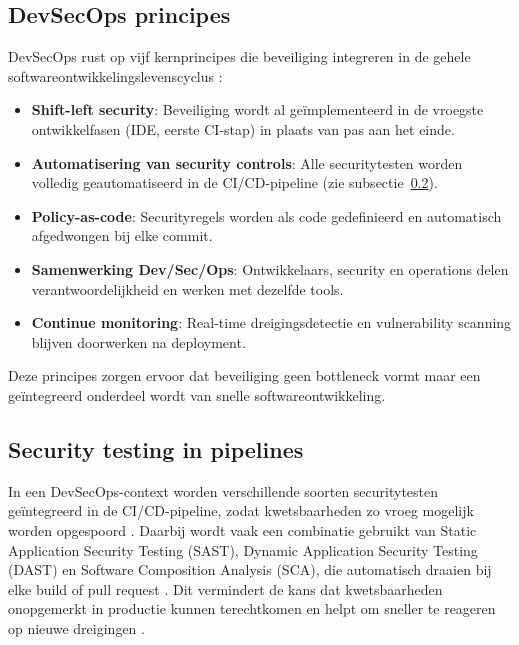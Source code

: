 \subsection{DevSecOps principes}
DevSecOps rust op vijf kernprincipes die beveiliging integreren in de gehele softwareontwikkelingslevenscyclus \autocite{RamdassJain2025}:

\begin{itemize}
\item \textbf{Shift-left security}: Beveiliging wordt al geïmplementeerd in de vroegste ontwikkelfasen (IDE, eerste CI-stap) in plaats van pas aan het einde.
\item \textbf{Automatisering van security controls}: Alle securitytesten worden volledig geautomatiseerd in de CI/CD-pipeline (zie subsectie~\ref{subsec:security-testing-pipelines}).
\item \textbf{Policy-as-code}: Securityregels worden als code gedefinieerd en automatisch afgedwongen bij elke commit.
\item \textbf{Samenwerking Dev/Sec/Ops}: Ontwikkelaars, security en operations delen verantwoordelijkheid en werken met dezelfde tools.
\item \textbf{Continue monitoring}: Real-time dreigingsdetectie en vulnerability scanning blijven doorwerken na deployment.
\end{itemize}

Deze principes zorgen ervoor dat beveiliging geen bottleneck vormt maar een geïntegreerd onderdeel wordt van snelle softwareontwikkeling.

\subsection{Security testing in pipelines}\label{subsec:security-testing-pipelines}

In een DevSecOps-context worden verschillende soorten securitytesten\\geïntegreerd in de CI/CD-pipeline, zodat kwetsbaarheden zo vroeg mogelijk worden opgespoord \autocite{RamdassJain2025}. Daarbij wordt vaak een combinatie gebruikt van Static Application Security Testing (SAST), Dynamic Application Security Testing (DAST) en Software Composition Analysis (SCA), die automatisch draaien bij elke build of pull request \autocite{AWS2021}. Dit vermindert de kans dat kwetsbaarheden onopgemerkt in productie kunnen terechtkomen en helpt om sneller te reageren op nieuwe dreigingen \autocite{Snyk2026}.

